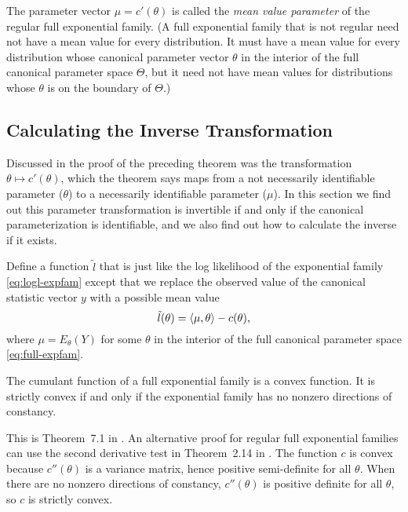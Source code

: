 The parameter vector $\mu = c'(\theta)$ is called
the \emph{mean value parameter} of the regular full exponential family.
(A full exponential family that is not regular need not have a mean
value for every distribution.  It must have a mean value for every
distribution whose canonical parameter vector $\theta$ in the interior
of the full canonical parameter space $\Theta$,
but it need not have mean values for distributions whose $\theta$ is
on the boundary of $\Theta$.)

\subsection{Calculating the Inverse Transformation}
\label{sec:calculating-inverse-transformation}

Discussed in the proof of the preceding theorem was the transformation
$\theta \mapsto c'(\theta)$, which the theorem says maps from a not
necessarily identifiable parameter ($\theta$) to a necessarily identifiable
parameter ($\mu$).  In this section we find out this parameter transformation
is invertible if and only if the canonical parameterization is identifiable,
and we also find out how to calculate the inverse if it exists.

Define a function $\tilde{l}$ that is just like the log likelihood
of the exponential family \eqref{eq:logl-expfam} except that we replace
the observed value of the canonical statistic vector $y$ with a possible
mean value
\begin{equation} \label{eq:logl-expfam-expected}
   \tilde{l}(\theta) = \langle \mu, \theta \rangle - c(\theta),
\end{equation}
where $\mu = E_\theta(Y)$ for some $\theta$ in the interior of the full
canonical parameter space \eqref{eq:full-expfam}.

\begin{lemma} \label{lem:convex}
The cumulant function of a full exponential family is a convex function.
It is strictly convex if and only if the exponential family has no
nonzero directions of constancy.
\end{lemma}
This is Theorem~{7.1} in \citet{barndorff-nielsen}.
An alternative proof for regular full exponential families can
use the second derivative test in Theorem~{2.14} in \citet{rockafellar-wets}.
The function $c$ is convex because $c''(\theta)$ is a variance matrix,
hence positive semi-definite for all $\theta$.
When there are no nonzero directions of constancy,
$c''(\theta)$ is positive definite for all $\theta$,
so $c$ is strictly convex.

